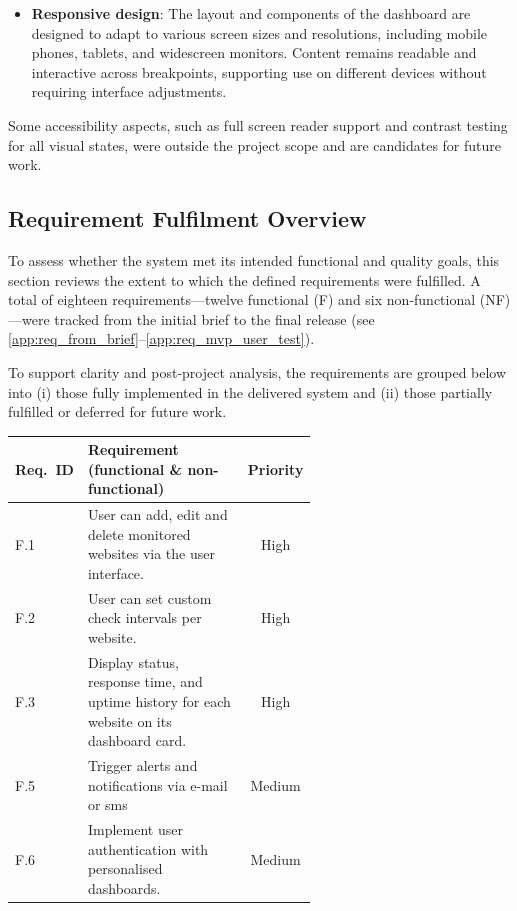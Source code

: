 {\begin{itemize}
    \item \textbf{Responsive design}: The layout and components of the dashboard are designed to adapt to various screen sizes and resolutions, including mobile phones, tablets, and widescreen monitors. Content remains readable and interactive across breakpoints, supporting use on different devices without requiring interface adjustments.
\end{itemize}

Some accessibility aspects, such as full screen reader support and contrast testing for all visual states, were outside the project scope and are candidates for future work.



\subsection{Requirement Fulfilment Overview}
\label{subsec:req_final}

To assess whether the system met its intended functional and quality goals, this section reviews the extent to which the defined requirements were fulfilled. A total of eighteen requirements—twelve functional (F) and six non-functional (NF)—were tracked from the initial brief to the final release (see \autoref{app:req_from_brief}–\autoref{app:req_mvp_user_test}).

To support clarity and post-project analysis, the requirements are grouped below into (i) those fully implemented in the delivered system and (ii) those partially fulfilled or deferred for future work.

\begin{table}[H]
\centering
\begin{tabular}{|l|p{0.60\linewidth}|c|}
\hline
\textbf{Req.\ ID} & \textbf{Requirement (functional \& non-functional)} & \textbf{Priority}\\ \hline
F.1  & User can add, edit and delete monitored websites via the user interface.& High   \\ \hline
F.2  & User can set custom check intervals per website.& High   \\ \hline
F.3  & Display status, response time, and uptime history for each website on its dashboard card.& High   \\ \hline
F.5& Trigger alerts and notifications via e-mail or sms& Medium \\ \hline
F.6& Implement user authentication with personalised dashboards.& Medium \\ \hline


\end{tabular}
\end{table}}
